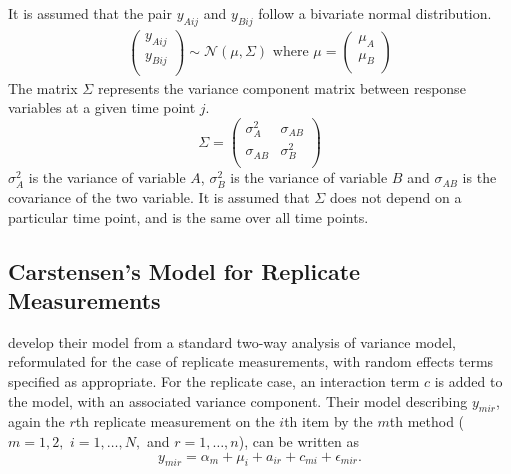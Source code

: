 \documentclass[12pt, a4paper]{report}
\theoremstyle{plain}
\theoremstyle{definition}
\theoremstyle{remark}
\begin{document}
It is assumed that the pair $y_{Aij}$ and $y_{Bij}$ follow a bivariate normal distribution.
\begin{eqnarray}
\left(
\begin{array}{c}
y_{Aij} \\
y_{Bij} \\
\end{array}
\right) \sim \mathcal{N}(
{\mu}, {\Sigma})\mbox{   where } {\mu} = \left(
\begin{array}{c}
\mu_{A} \\
\mu_{B} \\
\end{array}
\right)
\end{eqnarray}
The matrix ${\Sigma}$ represents the variance component matrix between response variables at a given time point $j$.
\begin{equation}
{\Sigma} = \left( \begin{array}{cc}
\sigma^2_{A} & \sigma_{AB} \\
\sigma_{AB} & \sigma^2_{B}\\
\end{array}\right)
\end{equation}
$\sigma^2_{A}$ is the variance of variable $A$, $\sigma^2_{B}$ is the variance of variable $B$ and $\sigma_{AB}$ is the covariance of the two variable. It is assumed that ${\Sigma}$ does not depend on a particular time point, and is the same over all time points.



\subsection{Carstensen's Model for Replicate Measurements}





\citet{BXC2008} develop their model from a standard two-way analysis of variance model, reformulated for the case of replicate measurements, with random effects terms specified as appropriate. 
For the replicate case, an interaction term $c$ is added to the model, with an associated variance component. Their model describing $y_{mir} $, again the $r$th replicate measurement on the $i$th item by the $m$th method ($m=1,2,$ $i=1,\ldots,N,$ and $r = 1,\ldots,n$), can be written as
\begin{equation}\label{BXC-model}
y_{mir}  = \alpha_{m} + \mu_{i} + a_{ir} + c_{mi} + \epsilon_{mir}.
\end{equation}
\end{document}
